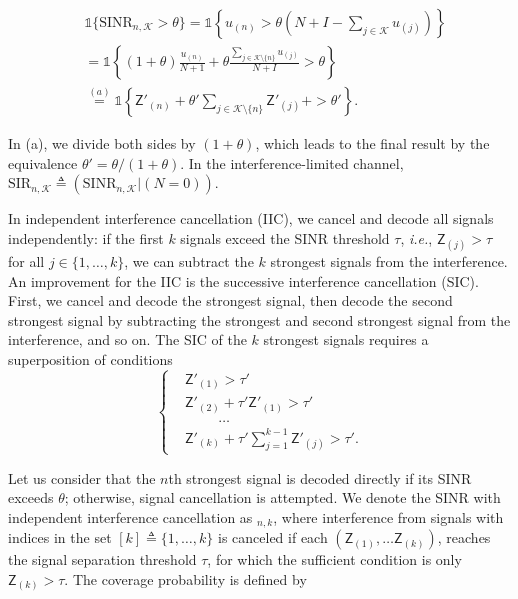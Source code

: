 \documentclass[lettersize,journal]{IEEEtran}
\begin{document}
\begin{align}
  \label{eq:IC-SINRcond}
   & \mathds{1}\{\text{SINR}_{n,\mathcal{K}} > \theta \} = \mathds{1} \left\{ u_{(n)} >\theta\left(N+I-  \sum_{j \in \mathcal{K}} u_{(j)}\right)\right\} \nonumber\\
  &\overset{}{=}\mathds{1} \left\{(1+\theta) \frac{u_{(n)}}{N+1}+ \theta \frac{\sum\limits^{}_{j\in \mathcal{K} \setminus \{n\}} u_{(j)}}{N+I}>\theta \right\} \nonumber \\
  &\overset{(a)}{=} \mathds{1} \left\{ \mathsf{Z}'_{(n)}+\theta'\sum^{}_{j\in \mathcal{K} \setminus \{n\}}\mathsf{Z}'_{(j)} +>\theta'\right\}.
\end{align}


In (a), we divide both sides by $(1+\theta)$, which leads to the final result by the equivalence $\theta' = \theta/(1+\theta)$. In the interference-limited channel, $\text{SIR}_{n,\mathcal{K}} \triangleq (\text{SINR}_{n,\mathcal{K}}|(N=0))$.




In independent interference cancellation (IIC), we cancel and decode all signals independently: if the first $k$ signals exceed the SINR threshold $\tau$, \textit{i.e.}, $\mathsf{Z}_{(j)} > \tau$ for all $j \in \{1,\dots,k\}$, we can subtract the $k$ strongest signals from the interference. An improvement for the IIC is the successive interference cancellation (SIC). First, we cancel and decode the strongest signal, then decode the second strongest signal by subtracting the strongest and second strongest signal from the interference, and so on. The SIC of the $k$ strongest signals requires a superposition of conditions
\begin{equation}
  \label{eq:SIC-SINRcond}
  \begin{cases}
    &\mathsf{Z}'_{(1)} > \tau'\\
    & \mathsf{Z}'_{(2)} + \tau' \mathsf{Z}'_{(1)}> \tau' \\
    &\hspace{1cm}\dots \\
    &\mathsf{Z}'_{(k)} + \tau' \sum_{j=1}^{k-1}\mathsf{Z}'_{(j)}> \tau'.
  \end{cases}
\end{equation}



Let us consider that the $n$th strongest signal is decoded directly if its SINR exceeds $\theta$; otherwise, signal cancellation is attempted. We denote the SINR with independent interference cancellation as $_{n,k}$, where interference from signals with indices in the set $[k] \triangleq \{1, \dots, k\}$ is canceled if each $(\mathsf{Z}_{(1)}, \dots  \mathsf{Z}_{(k)})$, reaches the signal separation threshold $\tau$, for which the sufficient condition is only $\mathsf{Z}_{(k)}>\tau$. The coverage probability is defined by
\end{document}
